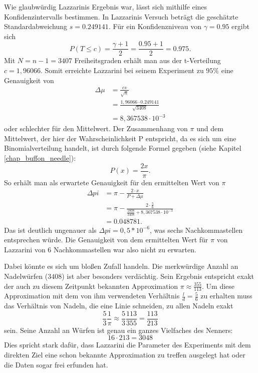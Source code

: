 \documentclass[10pt,twocolumn]{scrartcl}
\begin{document}
	Wie glaubwürdig Lazzarinis Ergebnis war, lässt sich mithilfe eines Konfidenzintervalls bestimmen.
	In Lazzarinis Versuch beträgt die geschätzte Standardabweichung $s = 0.249141$.
	Für ein Konfidenzniveau von $\gamma = 0.95$ ergibt sich
	\begin{equation}
	P(T \le c) = \frac{\gamma + 1}{2} = \frac{0.95 + 1}{2} = 0.975 .
	\end{equation}
	Mit $N = n - 1 = 3407$ Freiheitsgraden erhält man aus der t-Verteilung $c = 1,96066$.
	Somit erreichte Lazzarini bei seinem Experiment zu $95\%$ eine Genauigkeit von
	\begin{align}
	\Delta \mu &= \frac{cs}{\sqrt{n}} \\
	&= \frac{1,96066 \cdot 0.249141}{\sqrt{3408}} \\ \nonumber
	&= 8,367538 \cdot 10 ^{-3} \nonumber
	\end{align}
	oder schlechter für den Mittelwert. Der Zusammenhang von $\pi$ und dem Mittelwert, der hier der Wahrscheinlichkeit P entspricht, da es sich um eine Binomialverteilung handelt, ist durch folgende Formel gegeben (siehe Kapitel \ref{chap_buffon_needle}):
	\begin{equation}
	P(x) = \frac{2x}{\pi}.
	\end{equation}
	So erhält man als erwartete Genauigkeit für den ermittelten Wert von $\pi$
	\begin{align}
	\Delta pi &= \pi - \frac{2 \cdot x}{P + \Delta \mu} \\
	&= \pi - \frac{2 \cdot \frac{5}{6}}{\frac{1808}{3408} + 8,367538 \cdot 10 ^{-3}} \\ \nonumber
	&= 0.048781 \nonumber .
	\end{align}
	Das ist deutlich ungenauer als $\Delta pi = 0,5 * 10^{-6}$, was sechs Nachkommastellen entsprechen würde.
	Die Genauigkeit von dem ermittelten Wert für $\pi$ von Lazzarini von 6 Nachkommastellen war also nicht zu erwarten.
	
	Dabei könnte es sich um bloßen Zufall handeln. Die merkwürdige Anzahl an Nadelwürfen ($3408$) ist aber besonders verdächtig. Sein Ergebnis entspricht exakt der auch zu diesem Zeitpunkt bekannten Approximation $\pi \approx \frac{355}{113}$.
	Um diese Approximation mit dem von ihm verwendeten Verhältnis ${\tfrac {l}{d}={\tfrac {5}{6}}}$ zu erhalten muss das Verhältnis von Nadeln, die eine Linie schneiden, zu allen Nadeln exakt
	\begin{equation}
	\frac{5}{3} \frac{1}{\pi}  \approx \frac{5}{3} \frac{113}{355} = \frac{113}{213}
	\end{equation}
	sein.
	Seine Anzahl an Würfen ist genau ein ganzes Vielfaches des Nenners:
	\begin{equation}
	16 \cdot 213 = 3048
	\end{equation}
	Dies spricht stark dafür, dass Lazzarini die Parameter des Experiments mit dem direkten Ziel eine schon bekannte Approximation zu treffen ausgelegt hat oder die Daten sogar frei erfunden hat. \cite{Badger}
	
\end{document}
